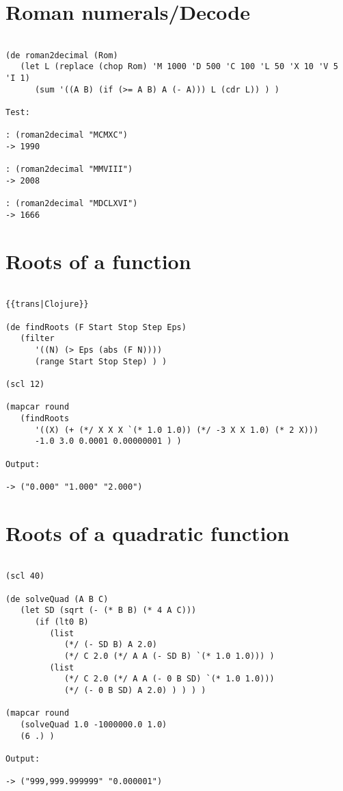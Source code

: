 \section*{Roman numerals/Decode}

\begin{verbatim}

(de roman2decimal (Rom)
   (let L (replace (chop Rom) 'M 1000 'D 500 'C 100 'L 50 'X 10 'V 5 'I 1)
      (sum '((A B) (if (>= A B) A (- A))) L (cdr L)) ) )

Test:

: (roman2decimal "MCMXC")
-> 1990

: (roman2decimal "MMVIII")
-> 2008

: (roman2decimal "MDCLXVI")
-> 1666

\end{verbatim}

\section*{Roots of a function}

\begin{verbatim}

{{trans|Clojure}}

(de findRoots (F Start Stop Step Eps)
   (filter
      '((N) (> Eps (abs (F N))))
      (range Start Stop Step) ) )

(scl 12)

(mapcar round
   (findRoots
      '((X) (+ (*/ X X X `(* 1.0 1.0)) (*/ -3 X X 1.0) (* 2 X)))
      -1.0 3.0 0.0001 0.00000001 ) )

Output:

-> ("0.000" "1.000" "2.000")

\end{verbatim}

\section*{Roots of a quadratic function}

\begin{verbatim}

(scl 40)

(de solveQuad (A B C)
   (let SD (sqrt (- (* B B) (* 4 A C)))
      (if (lt0 B)
         (list
            (*/ (- SD B) A 2.0)
            (*/ C 2.0 (*/ A A (- SD B) `(* 1.0 1.0))) )
         (list
            (*/ C 2.0 (*/ A A (- 0 B SD) `(* 1.0 1.0)))
            (*/ (- 0 B SD) A 2.0) ) ) ) )

(mapcar round
   (solveQuad 1.0 -1000000.0 1.0)
   (6 .) )

Output:

-> ("999,999.999999" "0.000001")

\end{verbatim}

